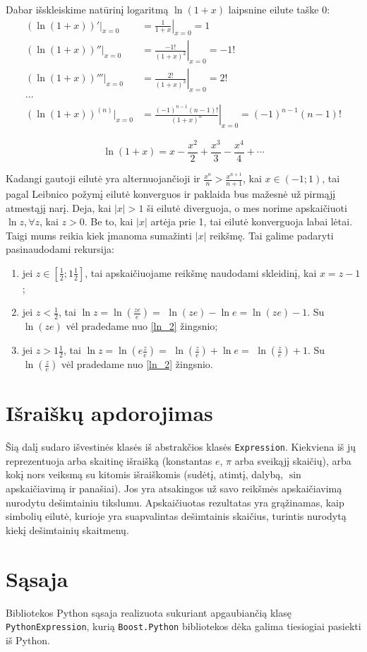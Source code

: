 Dabar išskleiskime natūrinį logaritmą $\ln (1+x)$ laipsnine eilute 
taške $0$:
\begin{align*}
  (\ln (1 + x))'|_{x=0} &= \left. \frac{1}{1+x} \right|_{x=0} = 1 \\
  (\ln (1 + x))''|_{x=0} &= \left. \frac{-1!}{(1+x)^{2}} \right|_{x=0} %
    = -1! \\
  (\ln (1 + x))'''|_{x=0} &= \left. \frac{2!}{(1+x)^{3}} \right|_{x=0} %
    = 2! \\
  \cdots \\
  (\ln (1 + x))^{(n)}|_{x=0} &= %
    \left. \frac{(-1)^{n-1}(n-1)!}{(1+x)^{n}} \right|_{x=0} = %
    (-1)^{n-1}(n-1)!
\end{align*}

\begin{equation}
  \ln (1 + x) = x - \frac{x^2}{2} + \frac{x^3}{3} - \frac{x^4}{4} + \cdots
  \label{ln_1}
\end{equation}

Kadangi gautoji eilutė yra alternuojančioji ir 
$\frac{x^n}{n} > \frac{x^{n+1}}{n+1}$, kai $x \in (-1; 1)$, tai pagal 
Leibnico požymį eilutė konverguos ir paklaida bus mažesnė už pirmąjį
atmestąjį narį. Deja, kai $|x| > 1$ ši eilutė diverguoja, o mes
norime apskaičiuoti $\ln z, \forall z$, kai $z > 0$. Be to, 
kai $|x|$ artėja prie 1, tai eilutė konverguoja labai lėtai. Taigi
mums reikia kiek įmanoma sumažinti $|x|$ reikšmę. Tai galime padaryti
pasinaudodami rekursija:
\begin{enumerate}
  \item \label{ln_2} jei $z \in \left[ \frac{1}{2}; 1\frac{1}{2} \right]$, 
    tai apskaičiuojame reikšmę naudodami skleidinį, kai $x = z - 1$;
  \item jei $z < \frac{1}{2}$, tai 
    $\ln z = \ln \left( \frac{ze}{e} \right) =$
    $\ln (ze) - \ln e = \ln (ze) - 1$. Su $\ln (ze)$ vėl pradedame
    nuo \ref{ln_2} žingsnio;
  \item jei $z > 1\frac{1}{2}$, tai 
    $\ln z = \ln \left( e\frac{z}{e} \right) =$
    $\ln \left( \frac{z}{e} \right) + \ln e =$
    $\ln \left( \frac{z}{e} \right) + 1$. Su 
    $\ln \left( \frac{z}{e} \right)$ vėl pradedame nuo \ref{ln_2}
    žingsnio.
\end{enumerate}

\section{Išraiškų apdorojimas}

Šią dalį sudaro išvestinės klasės iš abstrakčios klasės \verb|Expression|.
Kiekviena iš jų reprezentuoja arba skaitinę išraišką (konstantas $e$,
$\pi$ arba sveikąjį skaičių), arba kokį nors veiksmą su kitomis išraiškomis
(sudėtį, atimtį, dalybą, $\sin$ apskaičiavimą ir panašiai). Jos yra 
atsakingos už savo reikšmės apskaičiavimą nurodytu dešimtainiu tikslumu.
Apskaičiuotas rezultatas yra grąžinamas, kaip simbolių eilutė, kurioje yra
suapvalintas dešimtainis skaičius, turintis nurodytą kiekį dešimtainių
skaitmenų.

\section{Sąsaja}

\begin{sloppypar}
  Bibliotekos Python sąsaja realizuota sukuriant apgaubiančią klasę
  \verb|PythonExpression|, kurią \verb|Boost.Python| bibliotekos dėka
  galima tiesiogiai pasiekti iš Python.
\end{sloppypar}
